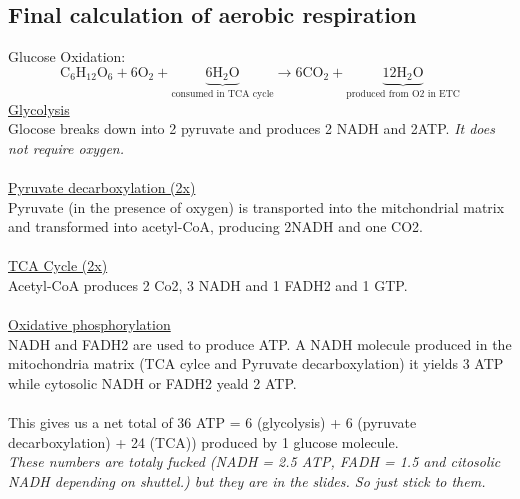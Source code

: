 \documentclass[../main.tex]{subfiles}
\begin{document}
\subsection{Final calculation of aerobic respiration}
\noindent
Glucose Oxidation: 
\[
\text{C}_6\text{H}_{12}\text{O}_6 + 6\text{O}_2 + \underbrace{6\text{H}_2\text{O}}_{\text{consumed in TCA cycle}}
\longrightarrow
6\text{CO}_2 + \underbrace{12\text{H}_2\text{O}}_{\text{produced from O2 in ETC}}
\]
\noindent
\underline{Glycolysis}\\
Glocose breaks down into 2 pyruvate and produces 2 NADH and 2ATP. \textit{It does not require oxygen.} \\
\\
\underline{Pyruvate decarboxylation (2x)}\\
Pyruvate (in the presence of oxygen) is transported into the mitchondrial matrix and transformed into acetyl-CoA, producing 2NADH and one CO2.\\
\\
\underline{TCA Cycle (2x)}\\
Acetyl-CoA produces 2 Co2, 3 NADH and 1 FADH2 and 1 GTP.\\
\\
\underline{Oxidative phosphorylation}\\
NADH and FADH2 are used to produce ATP. A NADH molecule produced in the mitochondria matrix (TCA cylce and Pyruvate decarboxylation) it yields 3 ATP while cytosolic NADH or FADH2 yeald 2 ATP. \\
\\
This gives us a net total of 36 ATP = 6 (glycolysis) + 6 (pyruvate decarboxylation) + 24 (TCA)) produced by 1 glucose molecule. \\
\indent \textit{These numbers are totaly fucked (NADH = 2.5 ATP, FADH = 1.5 and citosolic NADH depending on shuttel.) but they are in the slides. So just stick to them. }
\end{document}
